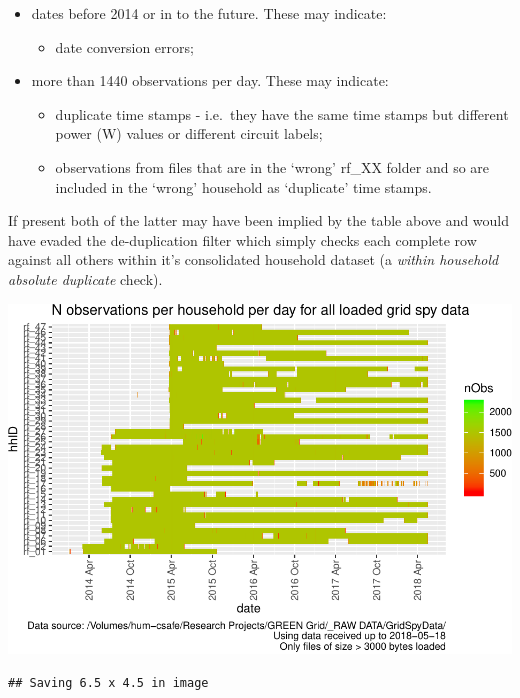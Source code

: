 \documentclass[]{article}
\providecommand{\tightlist}{%
  \setlength{\itemsep}{0pt}\setlength{\parskip}{0pt}}
\begin{document}
\begin{itemize}
\tightlist
\item
  dates before 2014 or in to the future. These may indicate:

  \begin{itemize}
  \tightlist
  \item
    date conversion errors;
  \end{itemize}
\item
  more than 1440 observations per day. These may indicate:

  \begin{itemize}
  \tightlist
  \item
    duplicate time stamps - i.e.~they have the same time stamps but
    different power (W) values or different circuit labels;
  \item
    observations from files that are in the `wrong' rf\_XX folder and so
    are included in the `wrong' household as `duplicate' time stamps.
  \end{itemize}
\end{itemize}

If present both of the latter may have been implied by the table above
and would have evaded the de-duplication filter which simply checks each
complete row against all others within it's consolidated household
dataset (a \emph{within household absolute duplicate} check).

\includegraphics{processNZGGElecCons1minData_files/figure-latex/loadedFilesObsPlots-1.pdf}

\begin{verbatim}
## Saving 6.5 x 4.5 in image
\end{verbatim}
\end{document}
